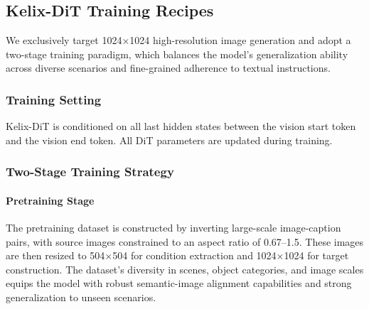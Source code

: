 \documentclass[11pt, a4paper, logo, copyright]{googledeepmind}
\begin{document}
\subsection{Kelix-DiT Training Recipes}
We exclusively target 1024×1024 high-resolution image generation and adopt a two-stage training paradigm, which balances the model’s generalization ability across diverse scenarios and fine-grained adherence to textual instructions.



\subsubsection{Training Setting}
Kelix-DiT is conditioned on all last hidden states between the vision start token and the vision end token.
All DiT parameters are updated during training.


\subsubsection{Two-Stage Training Strategy}
\paragraph{Pretraining Stage} The pretraining dataset is constructed by inverting large-scale image-caption pairs, with source images constrained to an aspect ratio of 0.67–1.5. These images are then resized to 504×504 for condition extraction and 1024×1024 for target construction. The dataset’s diversity in scenes, object categories, and image scales equips the model with robust semantic-image alignment capabilities and strong generalization to unseen scenarios.
\end{document}

